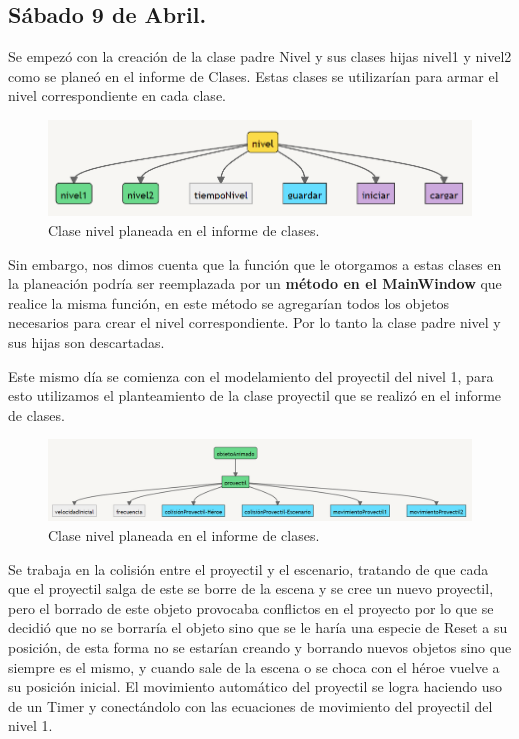 \documentclass{article}
\begin{document}
\subsection{Sábado 9 de Abril.}
Se empezó con la creación de la clase padre Nivel y sus clases hijas nivel1 y nivel2 como se planeó en el informe de Clases. Estas clases se utilizarían para armar el nivel correspondiente en cada clase.

\newpage
\begin{figure}[h]
\includegraphics[scale=0.6]{Images/niveles.png}
\centering
\caption{Clase nivel planeada en el informe de clases.}
\label{fig:niveles}
\end{figure}

Sin embargo, nos dimos cuenta que la función que le otorgamos a estas clases en la planeación podría ser reemplazada por un \textbf{método en el MainWindow} que realice la misma función, en este método se agregarían todos los objetos necesarios para crear el nivel correspondiente. Por lo tanto la clase padre nivel y sus hijas son descartadas.

Este mismo día se comienza con el modelamiento del proyectil del nivel 1, para esto utilizamos el planteamiento de la clase proyectil que se realizó en el informe de clases.

\begin{figure}[h]
\includegraphics[scale=0.5]{Images/proyectil.png}
\centering
\caption{Clase nivel planeada en el informe de clases.}
\label{fig:proyectil}
\end{figure}

Se trabaja en la colisión entre el proyectil y el escenario, tratando de que cada que el proyectil salga de este se borre de la escena y se cree un nuevo proyectil, pero el borrado de este objeto provocaba conflictos en el proyecto por lo que se decidió que no se borraría el objeto sino que se le haría una especie de Reset a su posición, de esta forma no se estarían creando y borrando nuevos objetos sino que siempre es el mismo, y cuando sale de la escena o se choca con el héroe vuelve a su posición inicial.
El movimiento automático del proyectil se logra haciendo uso de un Timer y conectándolo con las ecuaciones de movimiento del proyectil del nivel 1.
\end{document}
